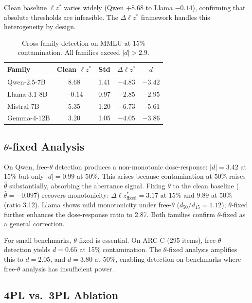 \documentclass[11pt,a4paper]{article}
\newcommand{\thetafixed}{$\theta$-fixed}
\begin{document}
Clean baseline $\ell z^*$ varies widely (Qwen $+8.68$ to Llama $-0.14$), confirming that absolute thresholds are infeasible. The $\Delta\ell z^*$ framework handles this heterogeneity by design.

\begin{table}[t]
\centering
\caption{Cross-family detection on MMLU at 15\% contamination. All families exceed $|d|>2.9$.}
\label{tab:crossfamily}
\small
\begin{tabular}{lcccc}
\toprule
Family & Clean $\ell z^*$ & Std & $\Delta\ell z^*$ & $d$ \\
\midrule
Qwen-2.5-7B & 8.68 & 1.41 & $-4.83$ & $-3.42$ \\
Llama-3.1-8B & $-0.14$ & 0.97 & $-2.85$ & $-2.95$ \\
Mistral-7B & 5.35 & 1.20 & $-6.73$ & $\mathbf{-5.61}$ \\
Gemma-4-12B & 3.20 & 1.05 & $-4.05$ & $-3.86$ \\
\bottomrule
\end{tabular}
\end{table}

\subsection{\thetafixed{} Analysis}\label{sec:thetafixed}

On Qwen, free-$\theta$ detection produces a non-monotonic dose-response: $|d|=3.42$ at 15\% but only $|d|=0.99$ at 50\%. This arises because contamination at 50\% raises $\hat{\theta}$ substantially, absorbing the aberrance signal. Fixing $\theta$ to the clean baseline ($\hat{\theta}=-0.097$) recovers monotonicity: $\Delta\ell z^*_{\text{fixed}} = 3.17$ at 15\% and $9.89$ at 50\% (ratio 3.12). Llama shows mild monotonicity under free-$\theta$ ($d_{50}/d_{15} = 1.12$); \thetafixed{} further enhances the dose-response ratio to 2.87. Both families confirm \thetafixed{} as a general correction.

For small benchmarks, \thetafixed{} is essential. On ARC-C (295 items), free-$\theta$ detection yields $d=0.65$ at 15\% contamination. The \thetafixed{} analysis amplifies this to $d=2.05$, and $d=3.80$ at 50\%, enabling detection on benchmarks where free-$\theta$ analysis has insufficient power.

\subsection{4PL vs.\ 3PL Ablation}\label{sec:ablation}
\end{document}
